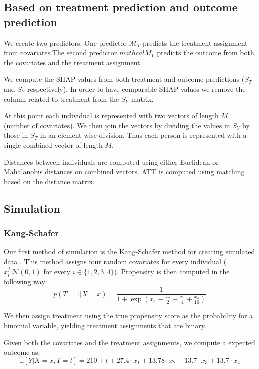 \documentclass{article}
\begin{document}
\subsection{Based on treatment prediction and outcome prediction}
We create two predictors. One predictor $\mathcal{M}_T$ predicts the treatment assignment from covariates.The second predictor $mathcal{M}_Y$ predicts the outcome from both the covariates and the treatment assignment. 

We compute the SHAP values from both treatment and outcome predictions ($S_T$ and $S_Y$ respectively). In order to have comparable SHAP values we remove the column related to treatment from the $S_Y$ matrix. 

At this point each individual is represented with two vectors of length $M$ (number of covariates). We then join the vectors by dividing the values in $S_Y$ by those in $S_T$ in an element-wise division. Thus each person is represented with a single combined vector of length $M$.

Distances between individuals are computed using either Euclidean or Mahalanobis distances on combined vectors. ATT is computed using matching based on the distance matrix.

\subsection{Simulation}
\subsubsection{Kang-Schafer}
Our first method of simulation is the Kang-Schafer method for creating simulated data \cite{kang2007demystifying}. This method assigns four random covariates for every individual ($x_i^j~\mathcal{N}(0,1)$ for every $i\in{}\{1,2,3,4\}$). 
Propensity is then computed in the following way:
\begin{equation*}
    p(T=1| X=x) = \frac{1}{1 + \exp{(x_1 - \frac{x_2}{2} + \frac{x_3}{4} + \frac{x_4}{10})}}
\end{equation*}

We then assign treatment using the true propensity score as the probability for a binomial variable, yielding treatment assignments that are binary. 

Given both the covariates and the treatment assignments, we compute a expected outcome as:
\begin{equation*}
    \mathbb{E}[Y|X=x, T=t] = 210 + t + 27.4 \cdot{} x_1 + 13.78 \cdot{} x_2 + 13.7 \cdot{} x_3 + 13.7 \cdot{} x_4
\end{equation*}
\end{document}
